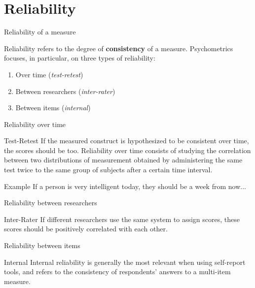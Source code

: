 \documentclass{beamer}
\begin{document}
\section{Reliability}
\begin{frame}{Reliability of a measure}
    \begin{block}{Reliability}
        refers to the degree of \textbf{consistency} of a measure. Psychometrics focuses, in particular, on three types of reliability:
    \end{block}
    \begin{enumerate}
        \item Over time (\textit{test-retest})
        \item Between researchers (\textit{inter-rater})
        \item Between items (\textit{internal})
    \end{enumerate}
\end{frame}

\begin{frame}{Reliability over time}
    \begin{block}{Test-Retest}
        If the measured construct is hypothesized to be consistent over time, the scores should be too. Reliability over time consists of studying the correlation between two distributions of measurement obtained by administering the same test twice to the same group of subjects after a certain time interval.
    \end{block}
    \begin{block}{Example}
        If a person is very intelligent today, they should be a week from now...
    \end{block}
\end{frame}

\begin{frame}{Reliability between researchers}
    \begin{block}{Inter-Rater}
        If different researchers use the same system to assign scores, these scores should be positively correlated with each other.
    \end{block}
\end{frame}

\begin{frame}{Reliability between items}
    \begin{block}{Internal}
        Internal reliability is generally the most relevant when using self-report tools, and refers to the consistency of respondents' answers to a multi-item measure.
    \end{block}
\end{frame}
\end{document}
